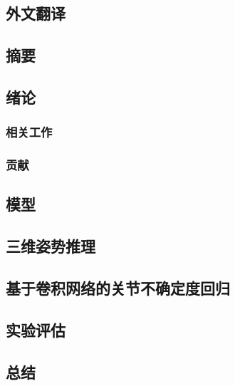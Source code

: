 \cleardoublepage
\begin{refsection}

\chapter{外文翻译}

\section*{摘要}


\section{绪论}


\subsection{相关工作}


\subsection{贡献}


\section{模型}


\section{三维姿势推理}


\section{基于卷积网络的关节不确定度回归}\label{sec:cnn}


\section{实验评估}


\section{总结}


\printbibliography[title={参考文献}]
% 
 
\end{refsection}

